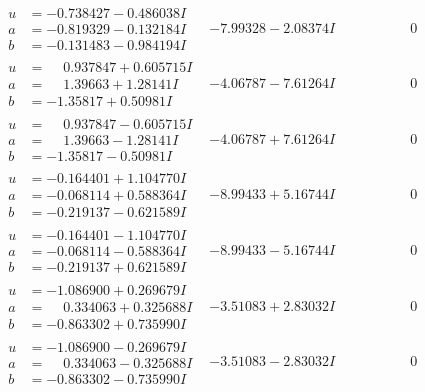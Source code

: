 \documentclass[1p]{elsarticle_modified}
\theoremstyle{definition}
\begin{document}
$$\begin{array}{c|c|c}
\begin{aligned}
u &= -0.738427 - 0.486038 I \\
a &= -0.819329 - 0.132184 I \\
b &= -0.131483 - 0.984194 I\end{aligned}
 & -7.99328 - 2.08374 I & \phantom{-0.000000 } 0 \\ \hline\begin{aligned}
u &= \phantom{-}0.937847 + 0.605715 I \\
a &= \phantom{-}1.39663 + 1.28141 I \\
b &= -1.35817 + 0.50981 I\end{aligned}
 & -4.06787 - 7.61264 I & \phantom{-0.000000 } 0 \\ \hline\begin{aligned}
u &= \phantom{-}0.937847 - 0.605715 I \\
a &= \phantom{-}1.39663 - 1.28141 I \\
b &= -1.35817 - 0.50981 I\end{aligned}
 & -4.06787 + 7.61264 I & \phantom{-0.000000 } 0 \\ \hline\begin{aligned}
u &= -0.164401 + 1.104770 I \\
a &= -0.068114 + 0.588364 I \\
b &= -0.219137 - 0.621589 I\end{aligned}
 & -8.99433 + 5.16744 I & \phantom{-0.000000 } 0 \\ \hline\begin{aligned}
u &= -0.164401 - 1.104770 I \\
a &= -0.068114 - 0.588364 I \\
b &= -0.219137 + 0.621589 I\end{aligned}
 & -8.99433 - 5.16744 I & \phantom{-0.000000 } 0 \\ \hline\begin{aligned}
u &= -1.086900 + 0.269679 I \\
a &= \phantom{-}0.334063 + 0.325688 I \\
b &= -0.863302 + 0.735990 I\end{aligned}
 & -3.51083 + 2.83032 I & \phantom{-0.000000 } 0 \\ \hline\begin{aligned}
u &= -1.086900 - 0.269679 I \\
a &= \phantom{-}0.334063 - 0.325688 I \\
b &= -0.863302 - 0.735990 I\end{aligned}
 & -3.51083 - 2.83032 I & \phantom{-0.000000 } 0 \\ \hline\begin{aligned}

\end{aligned}
\end{array}$$
\end{document}
